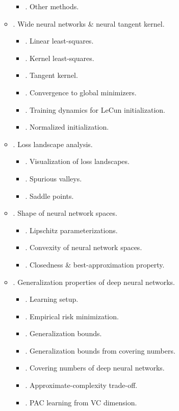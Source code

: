 \documentclass{article}
\begin{document}
\begin{enumerate}
\begin{itemize}
\begin{itemize}
			\item {. Other methods.}
		\end{itemize}
		\item {. Wide neural networks \& neural tangent kernel.}
		\begin{itemize}
			\item {. Linear least-squares.}
			\item {. Kernel least-squares.}
			\item {. Tangent kernel.}
			\item {. Convergence to global minimizers.}
			\item {. Training dynamics for LeCun initialization.}
			\item {. Normalized initialization.}
		\end{itemize}
		\item {. Loss landscape analysis.}
		\begin{itemize}
			\item {. Visualization of loss landscapes.}
			\item {. Spurious valleys.}
			\item {. Saddle points.}
		\end{itemize}
		\item {. Shape of neural network spaces.}
		\begin{itemize}
			\item {. Lipschitz parameterizations.}
			\item {. Convexity of neural network spaces.}
			\item {. Closedness \& best-approximation property.}
		\end{itemize}
		\item {. Generalization properties of deep neural networks.}
		\begin{itemize}
			\item {. Learning setup.}
			\item {. Empirical risk minimization.}
			\item {. Generalization bounds.}
			\item {. Generalization bounds from covering numbers.}
			\item {. Covering numbers of deep neural networks.}
			\item {. Approximate-complexity trade-off.}
			\item {. PAC learning from VC dimension.}

\end{itemize}
\end{itemize}
\end{enumerate}
\end{document}
